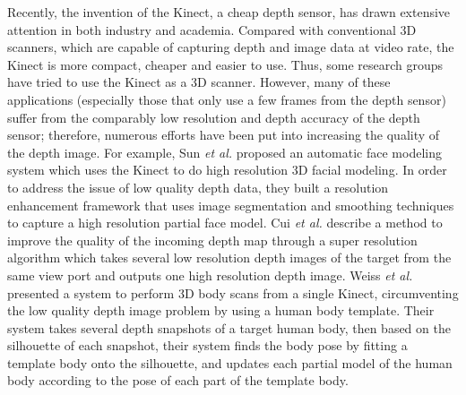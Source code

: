 \documentclass[12pt]{article}
\begin{document}
Recently, the invention of the Kinect, a cheap depth sensor, has drawn extensive attention in both industry and academia. Compared with conventional 3D scanners, which are capable of capturing depth and image data at video rate, the Kinect is more compact, cheaper and easier to use. Thus, some research groups have tried to use the Kinect as a 3D scanner. However, many of these applications (especially those that only use a few frames from the depth sensor) suffer from the comparably low resolution and depth accuracy of the depth sensor; therefore, numerous efforts have been put into increasing the quality of the depth image. For example, Sun \textit{et al.}\cite{Sun2012} proposed an automatic face modeling system which uses the Kinect to do high resolution 3D facial modeling. In order to address the issue of low quality depth data, they built a resolution enhancement framework that uses image segmentation and smoothing techniques to capture a high resolution partial face model. Cui \textit{et al.}\cite{Cui2013} describe a method to improve the quality of the incoming depth map through a super resolution algorithm which takes several low resolution depth images of the target from the same view port and outputs one high resolution depth image. Weiss \textit{et al.}\cite{Weiss2013} presented a system to perform 3D body scans from a single Kinect, circumventing the low quality depth image problem by using a human body template. Their system takes several depth snapshots of a target human body, then based on the silhouette of each snapshot, their system finds the body pose by fitting a template body onto the silhouette, and updates each partial model of the human body according to the pose of each part of the template body. 
\end{document}
